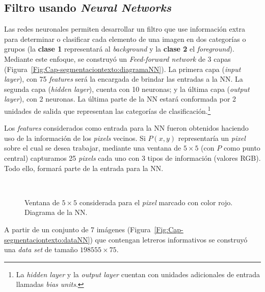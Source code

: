 \subsection{Filtro usando \textit{Neural Networks}}
Las redes neuronales permiten desarrollar un filtro que use información extra
para determinar o clasificar cada elemento de una imagen en dos categorías o
grupos (la \textbf{clase 1} representará al \textit{background} y la
\textbf{clase 2} el \textit{foreground}). Mediante este enfoque, se construyó un
\textit{Feed-forward network} de 3 capas
(Figura~\ref{Fig:Cap-segmentaciontexto:diagramaNN}). La primera capa
(\textit{input layer}), con 75 \textit{features} será la encargada de brindar
las entradas a la NN. La segunda capa (\textit{hidden layer}), cuenta con 10
neuronas; y la última capa (\textit{output layer}), con 2 neuronas. La última
parte de la NN estará conformada por 2 unidades de salida que representan las
categorías de clasificación.\footnote{La \textit{hidden layer} y la \textit{output layer} cuentan con unidades 
adicionales de entrada llamadas \textit{bias units}.}

Los \textit{features} considerados como entrada para la NN fueron obtenidos 
haciendo uso de la información de los \textit{pixels} vecinos. Si $P(x,y)$
representaría un \textit{pixel} sobre el cual se desea trabajar, mediante una
ventana de $5 \times 5$ (con $P$ como punto central) capturamos 25
\textit{pixels} cada uno con 3 tipos de información (valores RGB). Todo ello,
formará parte de la entrada para la NN. 

\begin{figure}[h!]
	\centering
   { }
   \\
	\caption{Ventana de $5 \times 5$ considerada para el \textit{pixel} marcado con color
	rojo. Diagrama de la NN.}
	\label{Fig:Cap-segmentaciontexto:input&diagramaNN}
\end{figure}

A partir de un conjunto de 7 imágenes 
(Figura~\ref{Fig:Cap-segmentaciontexto:dataNN}) que contengan letreros
informativos se construyó una \textit{data set} de tamaño $198555 \times 75$.

